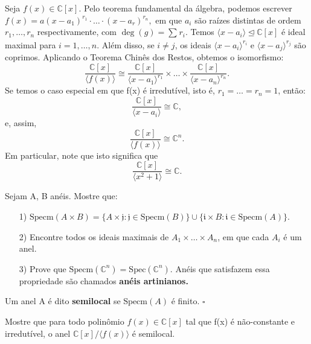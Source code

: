 \documentclass[algebraII_notes.tex]{subfiles}
\begin{document}
\begin{example}
	Seja \(f(x)\in \mathbb{C}[x].\) Pelo teorema fundamental da álgebra, podemos escrever \(f(x) = a(x-a_{1})^{r_{1}}\cdot \dotsc \cdot (x-a_{r})^{r_{n}},\)
	em que \(a_{i}\) são raízes distintas de ordem \(r_{1}, \dotsc, r_{n}\) respectivamente, com \(\deg{(g)} = \sum\limits_{}^{}r_{i}.\) Temos
	\(\langle x-a_{i} \rangle \trianglelefteq{\mathbb{C}[x]}\) é ideal maximal para \(i=1, \dotsc, n.\) Além disso, se \(i\neq j\), os ideais
	\(\langle x-a_{i} \rangle^{r_{i}}\) e \(\langle x-a_{j} \rangle^{r_{j}}\) são coprimos. Aplicando o Teorema Chinês dos Restos, obtemos o isomorfismo:
	\[
		\frac{\mathbb{C}[x]}{\langle f(x) \rangle}\cong \frac{\mathbb{C}[x]}{\langle x-a_{1} \rangle^{r_{1}}}\times \dotsc\times \frac{\mathbb{C}[x]}{\langle x-a_{n} \rangle^{r_{n}}}.
	\]
	Se temos o caso especial em que f(x) é irredutível, isto é, \(r_{1} = \dotsc = r_{n} = 1\), então:
	\[
		\frac{\mathbb{C}[x]}{\langle x-a_{i} \rangle}\cong{\mathbb{C}},
	\]
	e, assim,
	\[
		\frac{\mathbb{C}[x]}{\langle f(x) \rangle}\cong{\mathbb{C}^{n}}.
	\]
	Em particular, note que isto significa que
	\[
		\frac{\mathbb{C}[x]}{\langle x^{2}+1 \rangle}\cong \mathbb{C}.
	\]
\end{example}
\begin{example}[Exercícios]
	Sejam A, B anéis. Mostre que:
	\begin{itemize}
		\item[1)] \(\mathrm{Specm}(A\times B) = \{A\times \mathfrak{j}:\mathfrak{j}\in \mathrm{Specm}(B)\}\cup\{\mathfrak{i}\times B:\mathfrak{i}\in \mathrm{Specm}(A)\}.\)
		\item[2)] Encontre todos os ideais maximais de \(A_{1}\times \dotsc\times A_{n}\), em que cada
		      \(A_{i}\) é um anel.
		\item[3)] Prove que \(\mathrm{Specm}(\mathbb{C}^{n}) = \mathrm{Spec}(\mathbb{C}^{n}).\) Anéis que satisfazem essa propriedade
		      são chamados \textbf{anéis artinianos.}
	\end{itemize}
\end{example}
\begin{def*}
	Um anel A é dito \textbf{semilocal} se \(\mathrm{Specm}(A)\) é finito. \(\square\)
\end{def*}
\begin{prop*}[Exercício]
	Mostre que para todo polinômio \(f(x)\in \mathbb{C}[x]\) tal que f(x) é não-constante e irredutível, o anel
	\(\mathbb{C}[x]/\langle f(x) \rangle\) é semilocal.
\end{prop*}
\end{document}
